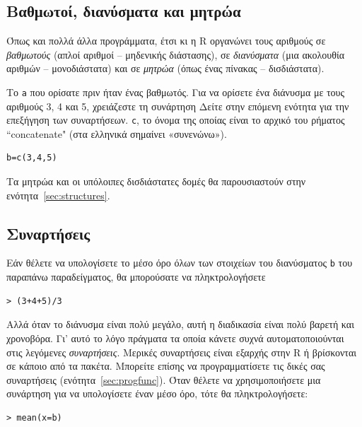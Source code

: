 \documentclass[a4paper,10pt,twocolumn]{article}
\makeatletter
\let\SF@@footnote\footnote
\def\footnote{\ifx\protect\@typeset@protect
 \expandafter\SF@@footnote
 \else
 \expandafter\SF@gobble@opt
 \fi
}
\edef\SF@gobble@opt{\noexpand\protect
 \expandafter\noexpand\csname SF@gobble@opt \endcsname}
\makeatother
\begin{document}
\subsection{Βαθμωτοί, διανύσματα και μητρώα}

Όπως και πολλά άλλα προγράμματα, έτσι κι η R οργανώνει τους αριθμούς σε \emph{βαθμωτούς} (απλοί αριθμοί --
μηδενικής διάστασης), σε \emph{διανύσματα} (μια ακολουθία αριθμών -- μονοδιάστατα) και σε \emph{μητρώα}
(όπως ένας πίνακας -- δισδιάστατα).

Το \texttt{a} που ορίσατε πριν ήταν ένας βαθμωτός. Για να ορίσετε ένα διάνυσμα με τους αριθμούς 3, 4 και 5,
χρειάζεστε τη συνάρτηση\footnote{Δείτε στην επόμενη ενότητα για την επεξήγηση των συναρτήσεων.} \texttt{c},
το όνομα της οποίας είναι το αρχικό του ρήματος ``concatenate" (στα ελληνικά σημαίνει «συνενώνω»). 

\begin{Verbatim}[frame=single,gobble=0]
b=c(3,4,5)
\end{Verbatim}

Τα μητρώα και οι υπόλοιπες δισδιάστατες δομές θα παρουσιαστούν στην ενότητα~\ref{sec:structures}.

\subsection{Συναρτήσεις}

Εάν θέλετε να υπολογίσετε το μέσο όρο όλων των στοιχείων του διανύσματος \texttt{b} του παραπάνω παραδείγματος,
θα μπορούσατε να πληκτρολογήσετε
 
\begin{Verbatim}[frame=single,gobble=0]
> (3+4+5)/3
\end{Verbatim}

Αλλά όταν το διάνυσμα είναι πολύ μεγάλο, αυτή η διαδικασία είναι πολύ βαρετή και χρονοβόρα. Γι' αυτό το λόγο
πράγματα τα οποία κάνετε συχνά αυτοματοποιούνται στις λεγόμενες \emph{συναρτήσεις}. Μερικές συναρτήσεις είναι 
εξαρχής στην R ή βρίσκονται σε κάποιο από τα πακέτα. Μπορείτε επίσης να προγραμματίσετε τις δικές σας 
συναρτήσεις (ενότητα~\ref{sec:progfunc}). Όταν θέλετε να χρησιμοποιήσετε μια συνάρτηση για να υπολογίσετε έναν
μέσο όρο, τότε θα πληκτρολογήσετε:

\begin{Verbatim}[frame=single,gobble=0]
> mean(x=b)
\end{Verbatim}
\end{document}
